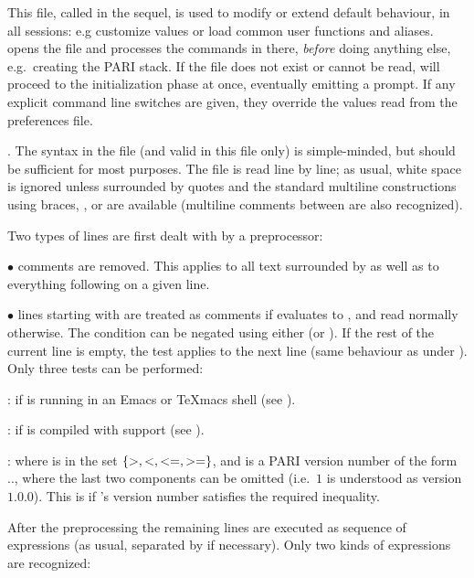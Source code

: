 This file, called  in the sequel, is used to modify or extend
default behaviour, in all  sessions: e.g customize  values or
load common user functions and aliases.  opens the  file and
processes the commands in there, \emph{before} doing anything else,
e.g.~creating the PARI stack. If the file does not exist or cannot be read,
 will proceed to the initialization phase at once, eventually emitting a
prompt. If any explicit command line switches are given, they override the
values read from the preferences file.

. The syntax in the  file (and valid in this file
only) is simple-minded, but should be sufficient for most purposes. The file
is read line by line; as usual, white space is ignored unless surrounded by
quotes and the standard multiline constructions using braces, \kbd{\bs}, or
\kbd{=} are available (multiline comments between \kbd{/*~\dots~*/} are also
recognized).

Two types of lines are first dealt with by a preprocessor:

$\bullet$ comments are removed. This applies to all text surrounded by
\kbd{/*~\dots~*/} as well as to everything following \kbd{\bs\bs} on a given
line.

$\bullet$ lines starting with   are treated as
comments if  evaluates to , and read normally
otherwise. The condition can be negated using either  (or
). If the rest of the current line is empty, the test applies to
the next line (same behaviour as \kbd{=} under ). Only three tests can be
performed:

:  if  is running in an Emacs or TeXmacs shell (see
).

:  if  is compiled with  support (see
).

  : where  is in the set
$\{ {\tt >}, {\tt <}, {\tt <=}, {\tt >=} \}$, and  is a PARI
version number of the form .., where the
last two components can be omitted (i.e.~$1$ is understood as version $1.0.0$).
This is  if 's version number satisfies the required
inequality.

After the preprocessing the remaining lines are executed as
sequence of expressions (as usual, separated by \kbd{;} if necessary). Only
two kinds of expressions are recognized:


